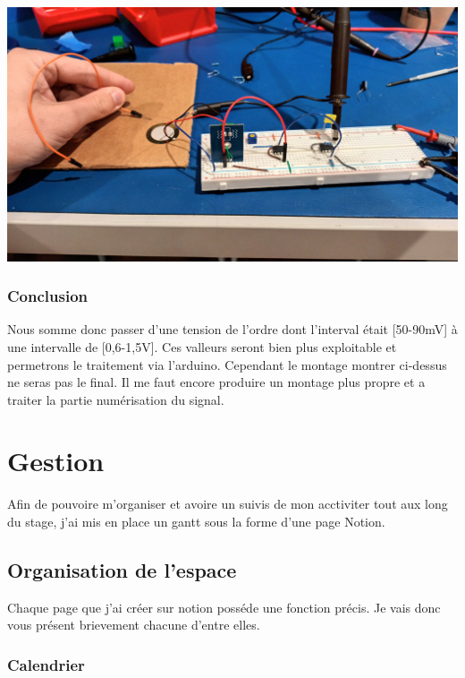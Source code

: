 \documentclass[11pt,french,a4paper]{article}
\begin{document}
\begin{center}	
\includegraphics[scale=0.1]{../img/froty.jpg}
\label{M}
\end{center}

\subsubsection{Conclusion}
Nous somme donc passer d’une tension de l’ordre dont l’interval était [50-90mV] à une intervalle de [0,6-1,5V]. Ces valleurs seront bien plus exploitable et permetrons le traitement via l’arduino.
Cependant le montage montrer ci-dessus ne seras pas le final. Il me faut encore produire un montage plus propre et a traiter la partie numérisation du signal.

\newpage
\section{Gestion}
Afin de pouvoire m'organiser et avoire un suivis de mon acctiviter tout aux long du stage, j'ai mis en place un gantt sous la forme d'une page Notion.

\subsection{Organisation de l'espace }
Chaque page que j'ai créer sur notion posséde une fonction précis. Je vais donc vous présent brievement chacune d'entre elles.
\subsubsection{Calendrier}
\end{document}
